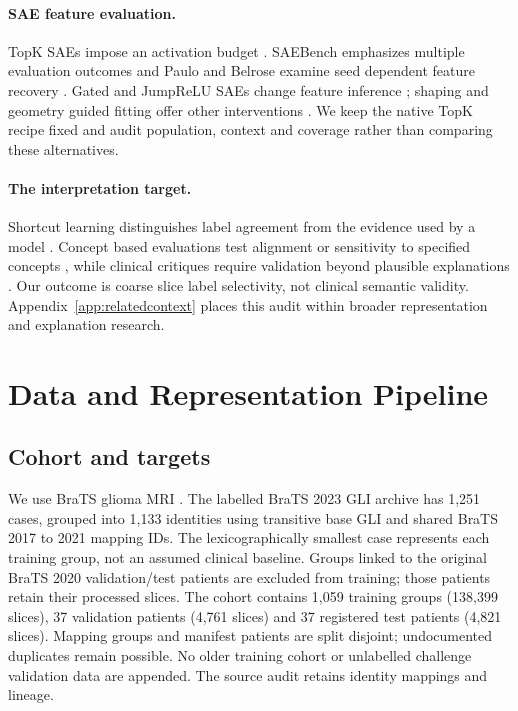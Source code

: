 \documentclass[letterpaper]{article}
\begin{document}
\paragraph{SAE feature evaluation.}
TopK SAEs impose an activation budget \cite{gao2024scaling}. SAEBench emphasizes multiple evaluation outcomes and Paulo and Belrose examine seed dependent feature recovery \cite{karvonen2025saebench,paulo2025differentfeatures}. Gated and JumpReLU SAEs change feature inference \cite{rajamanoharan2024gated,rajamanoharan2024jump}; shaping and geometry guided fitting offer other interventions \cite{delafrooznoroozi2026shaped,nerrise2026geosae}. We keep the native TopK recipe fixed and audit population, context and coverage rather than comparing these alternatives.

\paragraph{The interpretation target.}
Shortcut learning distinguishes label agreement from the evidence used by a model \cite{geirhos2020shortcut}. Concept based evaluations test alignment or sensitivity to specified concepts \cite{bau2017dissection,kim2018tcav}, while clinical critiques require validation beyond plausible explanations \cite{ghassemi2021falsehope}. Our outcome is coarse slice label selectivity, not clinical semantic validity. Appendix~\ref{app:relatedcontext} places this audit within broader representation and explanation research.

\section{Data and Representation Pipeline}
\subsection{Cohort and targets}
We use BraTS glioma MRI \cite{menze2014multimodal,baid2021brats,bakas2017advancing,bakas2017gbmdata,bakas2017lggdata}. The labelled BraTS 2023 GLI archive has 1,251 cases, grouped into 1,133 identities using transitive base GLI and shared BraTS 2017 to 2021 mapping IDs. The lexicographically smallest case represents each training group, not an assumed clinical baseline. Groups linked to the original BraTS 2020 validation/test patients are excluded from training; those patients retain their processed slices. The cohort contains 1,059 training groups (138,399 slices), 37 validation patients (4,761 slices) and 37 registered test patients (4,821 slices). Mapping groups and manifest patients are split disjoint; undocumented duplicates remain possible. No older training cohort or unlabelled challenge validation data are appended. The source audit retains identity mappings and lineage.
\end{document}
